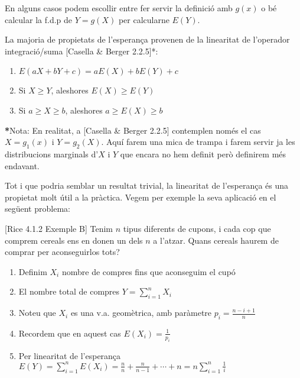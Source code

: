 \documentclass[letterpaper,10pt,english]{sphinxmanual}
\begin{document}
En alguns casos podem escollir entre fer servir la definició amb \(g(x)\)
o bé calcular la f.d.p de \(Y=g(X)\) per calcular\sphinxhyphen{}ne \(E(Y)\).

La majoria de propietats de l’esperança provenen de la
linearitat de l’operador integració/suma {[}Casella \& Berger 2.2.5{]}*:
\begin{enumerate}
%
\item {} 
\(E\left(a X + b Y + c\right) = aE\left( X\right) + b E\left( Y\right) + c\)

\item {} 
Si \(X \geq Y\), aleshores \(E\left(X\right)\geq E\left(Y\right)\)

\item {} 
Si \(a\geq X \geq b\), aleshores \(a \geq E\left(X\right)\geq b\)

\end{enumerate}


{\color{red}\bfseries{}*}Nota: En realitat, a {[}Casella \& Berger 2.2.5{]} contemplen només el cas
\(X=g_1(x)\) i \(Y=g_2(X)\). Aquí farem una mica de trampa i farem
servir ja les distribucions marginals d’\(X\) i \(Y\) que encara no hem definit
però definirem més endavant.

Tot i que podria semblar un resultat trivial, la linearitat de l’esperança és una propietat
molt útil a la pràctica. Vegem per exemple la seva aplicació en el següent problema:

{[}Rice 4.1.2 Exemple B{]} Tenim \(n\) tipus diferents de cupons, i cada cop que comprem cereals ens en donen
un dels \(n\) a l’atzar. Quans cereals haurem de comprar per aconseguir\sphinxhyphen{}los tots?
\begin{enumerate}
%
\item {} 
Definim \(X_i\) nombre de compres fins que aconseguim el cupó 

\item {} 
El nombre total de compres \(Y=\sum_{i=1}^n X_i\)

\item {} 
Noteu que \(X_i\) es una v.a. geomètrica, amb paràmetre \(p_i = \frac{n -i + 1}{n}\)

\item {} 
Recordem que en aquest cas \(E(X_i) = \frac{1}{p_i}\)

\item {} 
Per linearitat de l’esperança \(E(Y)=\sum_{i=1}^n E(X_i) = \frac{n}{n} + \frac{n}{n-1} + \cdots + n = n\sum_{i=1}^n\frac{1}{i}\)

\end{enumerate}
\end{document}
